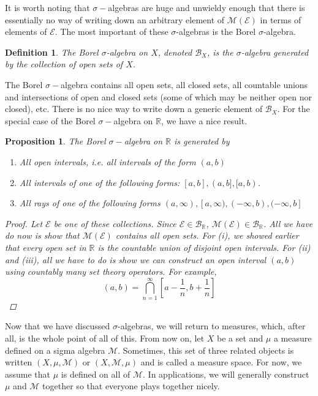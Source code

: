 \documentclass[12pt]{amsart}         %
\newtheorem{definition}{Definition}[section]
\newtheorem{proposition}{Proposition}[section]
\theoremstyle{remark}
\newcommand{\R}{\mathbb{R}}
\begin{document}
It is worth noting that $\sigma-$algebras are huge and unwieldy enough that there is essentially no way of writing down an arbitrary element of $\mathcal{M}(\mathcal{E})$ in terms of elements of $\mathcal{E}$. The most important of these $\sigma$-algebras is the Borel $\sigma$-algebra.

\begin{definition}
The \emph{Borel $\sigma$-algebra} on $X$, denoted $\mathcal{B}_X$, is the $\sigma$-algebra generated by the collection of open sets of $X$.
\end{definition}

The Borel $\sigma-$algebra contains all open sets, all closed sets, all countable unions and intersections of open and closed sets (some of which may be neither open nor closed), etc. There is no nice way to write down a generic element of $\mathcal{B}_X$. For the special case of the Borel $\sigma-$algebra on $\R$, we have a nice result.

\begin{proposition}The Borel $\sigma-$algebra on $\R$ is generated by 
\begin{enumerate}
	\item All open intervals, i.e. all intervals of the form $(a, b)$
	\item All intervals of one of the following forms: $[a, b], (a, b], [a, b)$.
	\item All rays of one of the following forms $(a, \infty), [a, \infty), (-\infty, b), (-\infty, b]$
\end{enumerate}
\begin{proof}
Let $\mathcal{E}$ be one of these collections. Since $\mathcal{E} \in \mathcal{B}_\R$, $\mathcal{M}(\mathcal{E}) \in \mathcal{B}_\R$. All we have do now is show that $\mathcal{M}(\mathcal{E})$ contains all open sets. For (i), we showed earlier that every open set in $\R$ is the countable union of disjoint open intervals. For (ii) and (iii), all we have to do is show we can construct an open interval $(a, b)$ using countably many set theory operators. For example,
\[
(a, b) = \bigcap_{n=1}^\infty \left[ a - \frac{1}{n}, b + \frac{1}{n}  \right]
\]
\end{proof}
\end{proposition}

Now that we have discussed $\sigma$-algebras, we will return to measures, which, after all, is the whole point of all of this. From now on, let $X$ be a set and $\mu$ a measure defined on a sigma algebra $\mathcal{M}$. Sometimes, this set of three related objects is written $(X, \mu, \mathcal{M})$ or $(X, \mathcal{M}, \mu)$ and is called a measure space. For now, we assume that $\mu$ is defined on all of $\mathcal{M}$. In applications, we will generally construct $\mu$ and $\mathcal{M}$ together so that everyone plays together nicely.
\end{document}
